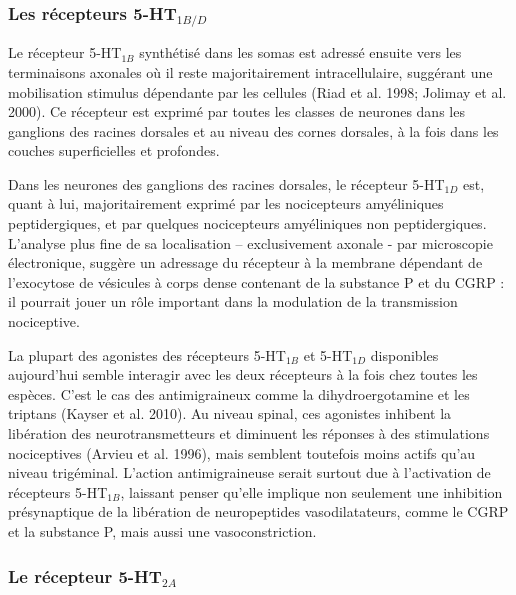 \documentclass[a4paper,12pt,twoside]{report}
\begin{document}
\subsubsection{Les récepteurs 5-HT$_{1B/D}$}

Le récepteur 5-HT$_{1B}$ synthétisé dans les somas est adressé ensuite vers les terminaisons axonales où il reste majoritairement intracellulaire, suggérant une mobilisation stimulus dépendante par les cellules (Riad et al. 1998; Jolimay et al. 2000). Ce récepteur est exprimé par toutes les classes de neurones dans les ganglions des racines dorsales et au niveau des cornes dorsales, à la fois dans les couches superficielles et profondes.

Dans les neurones des ganglions des racines dorsales, le récepteur 5-HT$_{1D}$ est, quant à lui, majoritairement exprimé par les nocicepteurs amyéliniques peptidergiques, et par quelques nocicepteurs amyéliniques non peptidergiques. L’analyse plus fine de sa localisation – exclusivement axonale - par microscopie électronique, suggère un adressage du récepteur à la membrane dépendant de l’exocytose de vésicules à corps dense contenant de la substance P et du CGRP : il pourrait jouer un rôle important dans la modulation de la transmission nociceptive. 

La plupart des agonistes des récepteurs 5-HT$_{1B}$ et 5-HT$_{1D}$ disponibles aujourd’hui semble interagir avec les deux récepteurs à la fois chez toutes les espèces. C’est le cas des antimigraineux comme la dihydroergotamine et les triptans (Kayser et al. 2010). Au niveau spinal, ces agonistes inhibent la libération des neurotransmetteurs et diminuent les réponses à des stimulations nociceptives (Arvieu et al. 1996), mais semblent toutefois moins actifs qu’au niveau trigéminal. L’action antimigraineuse serait surtout due à l’activation de récepteurs 5-HT$_{1B}$, laissant penser qu’elle implique non seulement une inhibition présynaptique de la libération de neuropeptides vasodilatateurs, comme le CGRP et la substance P, mais aussi une vasoconstriction.

\subsubsection{Le récepteur 5-HT$_{2A}$}
\end{document}
